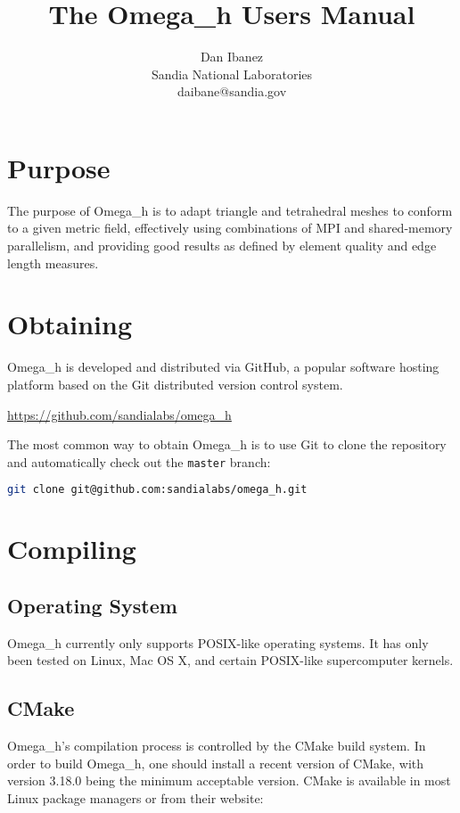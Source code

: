 \documentclass{article}
\title{The Omega\_h Users Manual}
\author{Dan Ibanez\\
Sandia National Laboratories\\
daibane@sandia.gov}
\begin{document}
\maketitle

\section{Purpose}

The purpose of Omega\_h is to adapt triangle and tetrahedral
meshes to conform to a given metric field,
effectively using combinations of MPI and shared-memory parallelism,
and providing good results as defined by element quality and
edge length measures.

\section{Obtaining}

Omega\_h is developed and distributed via GitHub,
a popular software hosting platform based on the
Git distributed version control system.

\url{https://github.com/sandialabs/omega_h}

The most common way to obtain Omega\_h is to
use Git to clone the repository and automatically
check out the \texttt{master} branch:

\begin{lstlisting}[language=bash]
git clone git@github.com:sandialabs/omega_h.git
\end{lstlisting}

\section{Compiling}

\subsection{Operating System}

Omega\_h currently only supports POSIX-like operating systems.
It has only been tested on Linux, Mac OS X, and certain POSIX-like
supercomputer kernels.

\subsection{CMake}

Omega\_h's compilation process is controlled by the CMake
build system.
In order to build Omega\_h, one should install a recent
version of CMake, with version 3.18.0 being the minimum
acceptable version.
CMake is available in most Linux package managers
or from their website:
\end{document}
